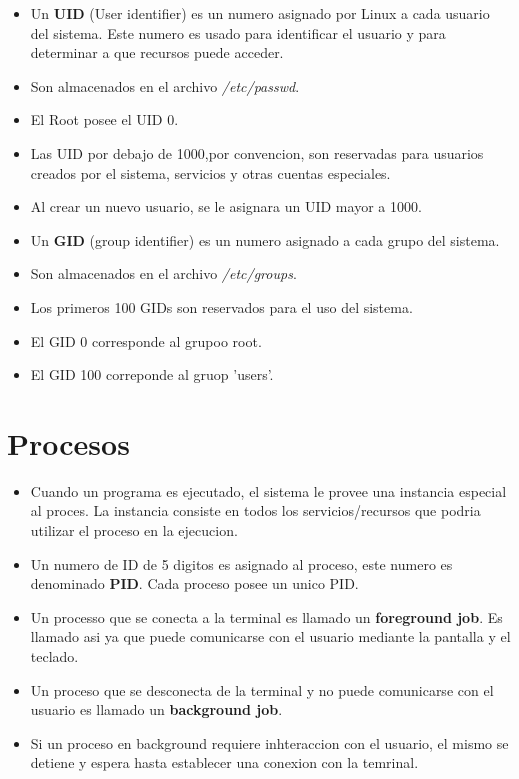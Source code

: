 \documentclass[11pt]{article}
\begin{document}
\begin{itemize}
    \item Un \textbf{UID} (User identifier) es un numero asignado por Linux a cada usuario del sistema. Este numero es usado para identificar el usuario y para determinar a que recursos puede acceder.
    \item Son almacenados en el archivo \textit{/etc/passwd}.
    \item El Root posee el UID 0.
    \item Las UID por debajo de 1000,por convencion, son reservadas para usuarios creados por el sistema, servicios y otras cuentas especiales.
    \item Al crear un nuevo usuario, se le asignara un UID mayor a 1000.
    \item Un \textbf{GID} (group identifier) es un numero asignado a cada grupo del sistema.
    \item Son almacenados en el archivo \textit{/etc/groups}.
    \item Los primeros 100 GIDs son reservados para el uso del sistema.
    \item El GID 0 corresponde al grupoo root.
    \item El GID 100 correponde al gruop 'users'.
\end{itemize}

\section{Procesos}
\begin{itemize}
\item Cuando un programa es ejecutado, el sistema le provee una instancia especial al proces. La instancia consiste en todos los servicios/recursos que podria utilizar el proceso en la ejecucion.
\item Un numero de ID de 5 digitos es asignado al proceso, este numero es denominado \textbf{PID}. Cada proceso posee un unico PID.
\item Un processo que se conecta a la terminal es llamado un \textbf{foreground job}. Es llamado asi ya que puede comunicarse con el usuario mediante la pantalla y el teclado.
\item Un proceso que se desconecta de la terminal y no puede comunicarse con el usuario es llamado un \textbf{background job}.
\item Si un proceso en background requiere inhteraccion con el usuario, el mismo se detiene y espera hasta establecer una conexion con la temrinal.
\end{itemize}
\end{document}
